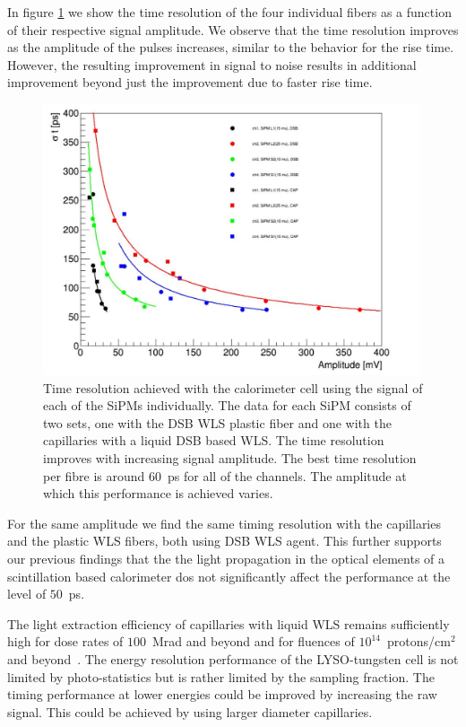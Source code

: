 In figure \ref{TimeResolution} we show the time resolution of the four
individual fibers as a function of their respective signal amplitude. We observe 
that the time resolution improves as the amplitude of the pulses increases, 
similar to the behavior for the rise time. However, the resulting improvement in 
signal to noise results in additional improvement beyond just the improvement due
to faster rise time. 

%
\begin{figure}[htb]
\includegraphics[width=0.99\textwidth]{SH_timing_SiPM.pdf}
\caption{\label{TimeResolution} Time resolution achieved with the calorimeter cell using the signal of each 
of the  SiPMs individually. The data for each SiPM consists of two sets, one with the DSB WLS plastic fiber and one with 
the capillaries with a liquid DSB based WLS. The time resolution improves with increasing signal amplitude. The best time 
resolution per fibre is around $60$~ps for all of the channels. The amplitude at which this performance is achieved varies.}
\end{figure}
%


For the same amplitude we find the same timing resolution with the capillaries
and the plastic WLS fibers, both using DSB WLS agent. This further supports our
previous findings that the the light propagation in the optical elements of a
scintillation based calorimeter dos not significantly affect the performance at
the level of $50$~ps.

The light extraction efficiency of capillaries with liquid WLS remains
sufficiently high for dose rates of $100$~Mrad and beyond and for fluences of
$10^{14}$~protons/$\mathrm{cm}^{2}$ and beyond~\cite{shashlik2}. The
energy resolution performance of the LYSO-tungsten cell is not limited by
photo-statistics but is rather limited by the sampling fraction. The timing
performance at lower energies could be improved by increasing the raw signal.
This could be achieved by using larger diameter capillaries.\\ 

